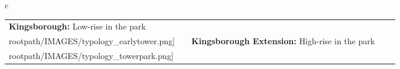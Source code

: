 \begin{table}[H]
        \begin{tabular}{c}
        \begin{tabular}{m{1.25in} m{2in} m{.1in} m{1.25in} m{2in}}
\textbf{Kingsborough:} {Low-rise in the park} & \texttt{[image: \\rootpath/IMAGES/typology\_earlytower.png]} & & \textbf{Kingsborough Extension:} {High-rise in the park} & \texttt{[image: \\rootpath/IMAGES/typology\_towerpark.png]}
\end{tabular}\end{tabular}
        \end{table}
